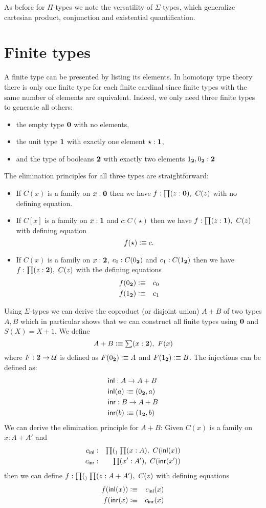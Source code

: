 As before for $\Pi$-types we note the versatility of $\Sigma$-types,
which generalize cartesian product, conjunction and existential
quantification. 

\section{Finite types}
\label{sec:finite-types}

A finite type can be presented by listing its elements. In homotopy
type theory there is only one finite type for each finite cardinal
since finite types with the same number of elements are equivalent.
Indeed, we only need three finite types to generate all others: 
\begin{itemize}
\item the empty type $\mathbf{0}$ with no elements,
\item the unit type $\mathbf{1}$ with exactly one element $\star:\mathbf{1}$,
\item and the type of booleans $\mathbf{2}$ with exactly two elements
  $1_{\mathbf{2}},0_{\mathbf{2}} : \mathbf{2}$
\end{itemize}
The elimination principles for all three types are straightforward:
\begin{itemize}
\item If $C(x)$ is a family on $x:\mathbf{0}$ then we have $f:\prd{z:\emptyt}C(z)$ with no defining equation.
\item If $C[x]$ is a family on $x:\mathbf{1}$ and $c:C(\star)$ then we have $f:\prd{z:\unit}C(z)$ with defining equation
  \[ f(\star)\vcentcolon\equiv c.\]
\item If $C(x)$ is a family on $x:\mathbf{2}$, $c_0:C(0_{\mathbf{2}})$ 
and $c_1:C(1_{\mathbf{2}})$ then we have $f:\prd{z:\bool}C(z)$ with the
defining equations
\begin{eqnarray*}
f(0_{\mathbf{2}}) & \vcentcolon\equiv& c_0\\
f(1_{\mathbf{2}}) & \vcentcolon\equiv & c_1
\end{eqnarray*}
\end{itemize}
Using $\Sigma$-types we can derive the coproduct (or disjoint union) $A+B$
of two types $A,B$ which in particular shows that we can construct all
finite types using $\mathbf{0}$ and $S(X) = X+1$. We define
\[A + B \defeq \sm{x:\bool}F(x)\]
where $F : \mathbf{2} \to \mathcal{U}$ is
defined as $F(0_{\mathbf{2}}) \vcentcolon\equiv A$ and $F(1_{\mathbf{2}})\vcentcolon\equiv B$. The
injections can be defined as:
\begin{align*}
& \mathsf{inl} :  A \to A+B\\
& \mathsf{inl}(a) \vcentcolon\equiv (0_{\mathbf{2}},a)\\
& \mathsf{inr} :  B \to A+B\\
& \mathsf{inr}(b) \vcentcolon\equiv (1_{\mathbf{2}},b)
\end{align*}
We can derive the elimination principle for $A+B$:
Given  $C(x)$ is a family on $x:A+A'$ and
\begin{eqnarray*}
c_\inl & : & \prd_{x:A}C(\inl(x)) \\
c_\inr & : & \prd{x':A'}C(\inr(x'))
\end{eqnarray*}
then we can define $f:\prd_{z:A+A'}C(z)$ with defining equations
\begin{eqnarray*}
f(\mathsf{inl}(x)) & \vcentcolon\equiv& c_\mathsf{inl}(x)  \\
f(\mathsf{inr}(x) & \vcentcolon\equiv & c_\mathsf{inr}(x)  
\end{eqnarray*}

